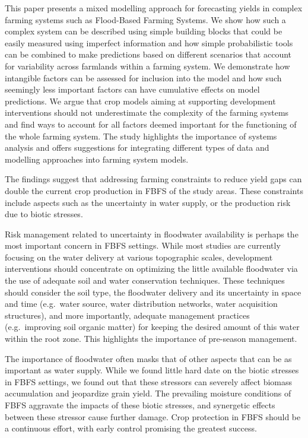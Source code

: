 \documentclass[]{elsarticle} %
\begin{document}
This paper presents a mixed modelling approach for forecasting yields in complex farming systems such as Flood-Based Farming Systems. We show how such a complex system can be described using simple building blocks that could be easily measured using imperfect information and how simple probabilistic tools can be combined to make predictions based on different scenarios that account for variability across farmlands within a farming system. We demonstrate how intangible factors can be assessed for inclusion into the model and how such seemingly less important factors can have cumulative effects on model predictions. We argue that crop models aiming at supporting development interventions should not underestimate the complexity of the farming systems and find ways to account for all factors deemed important for the functioning of the whole farming system. The study highlights the importance of systems analysis and offers suggestions for integrating different types of data and modelling approaches into farming system models.

The findings suggest that addressing farming constraints to reduce yield gaps can double the current crop production in FBFS of the study areas. These constraints include aspects such as the uncertainty in water supply, or the production risk due to biotic stresses.

Risk management related to uncertainty in floodwater availability is perhaps the most important concern in FBFS settings. While most studies are currently focusing on the water delivery at various topographic scales, development interventions should concentrate on optimizing the little available floodwater via the use of adequate soil and water conservation techniques. These techniques should consider the soil type, the floodwater delivery and its uncertainty in space and time (e.g.~water source, water distribution networks, water acquisition structures), and more importantly, adequate management practices (e.g.~improving soil organic matter) for keeping the desired amount of this water within the root zone. This highlights the importance of pre-season management.

The importance of floodwater often masks that of other aspects that can be as important as water supply. While we found little hard date on the biotic stresses in FBFS settings, we found out that these stressors can severely affect biomass accumulation and jeopardize grain yield. The prevailing moisture conditions of FBFS aggravate the impacts of these biotic stresses, and synergetic effects between these stressor cause further damage. Crop protection in FBFS should be a continuous effort, with early control promising the greatest success.
\end{document}
